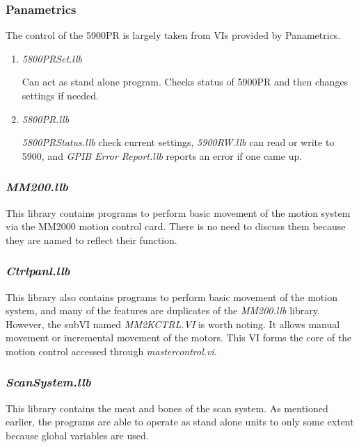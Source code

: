 \documentclass[10pt]{article}
\begin{document}
\subsubsection{Panametrics}

The control of the 5900PR is largely taken from VIs provided by
Panametrics.


\begin{enumerate}

\item {\it 5800PRSet.llb}

Can act as stand alone program. Checks status of 5900PR and then
changes settings if needed.

\item {\it 5800PR.llb}

{\it 5800PRStatus.llb} check current settings, {\it 5900RW.llb}
can read or write to 5900, and {\it GPIB Error Report.llb} reports
an error if one came up.

\end{enumerate}


\subsubsection{{\it MM200.llb}}

This library contains programs to perform basic movement of the
motion system via the MM2000 motion control card. There is no need
to discuss them because they are named to reflect their function.


\subsubsection{{\it Ctrlpanl.llb}}

This library also contains programs to perform basic movement of
the motion system, and many of the features are duplicates of the
{\it MM200.llb} library. However, the subVI named {\it
MM2KCTRL.VI} is worth noting. It allows manual movement or
incremental movement of the motors. This VI forms the core of the
motion control accessed through {\it mastercontrol.vi}.

\subsubsection{{\it ScanSystem.llb}}
\label{acqcon}

This library contains the meat and bones of the scan system. As
mentioned earlier, the programs are able to operate as stand alone
units to only some extent because global variables are used.
\end{document}
